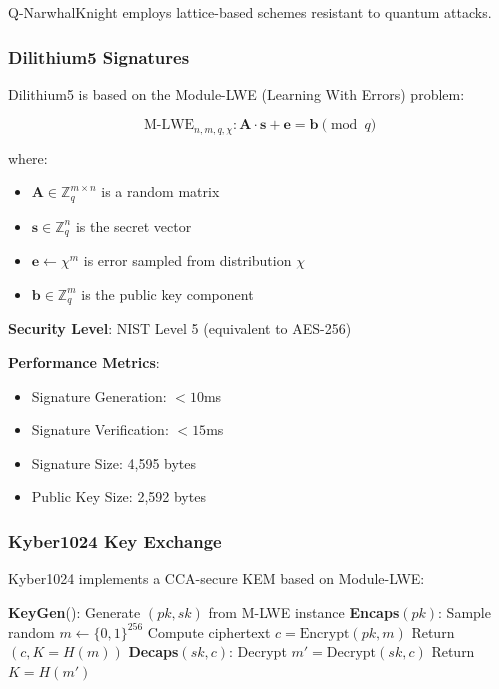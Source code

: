 \documentclass[11pt,a4paper]{article}
\begin{document}
Q-NarwhalKnight employs lattice-based schemes resistant to quantum attacks.

\subsubsection{Dilithium5 Signatures}

Dilithium5 is based on the Module-LWE (Learning With Errors) problem:

\begin{equation}
\text{M-LWE}_{n,m,q,\chi}: \mathbf{A} \cdot \mathbf{s} + \mathbf{e} = \mathbf{b} \pmod{q}
\end{equation}

where:
\begin{itemize}
    \item $\mathbf{A} \in \mathbb{Z}_q^{m \times n}$ is a random matrix
    \item $\mathbf{s} \in \mathbb{Z}_q^n$ is the secret vector
    \item $\mathbf{e} \leftarrow \chi^m$ is error sampled from distribution $\chi$
    \item $\mathbf{b} \in \mathbb{Z}_q^m$ is the public key component
\end{itemize}

\textbf{Security Level}: NIST Level 5 (equivalent to AES-256)

\textbf{Performance Metrics}:
\begin{itemize}
    \item Signature Generation: $<10$ms
    \item Signature Verification: $<15$ms
    \item Signature Size: 4,595 bytes
    \item Public Key Size: 2,592 bytes
\end{itemize}

\subsubsection{Kyber1024 Key Exchange}

Kyber1024 implements a CCA-secure KEM based on Module-LWE:

\begin{algorithm}
\caption{Kyber1024 Key Encapsulation}
\begin{algorithmic}
\STATE \textbf{KeyGen}(): Generate $(pk, sk)$ from M-LWE instance
\STATE \textbf{Encaps}$(pk)$: 
    \STATE \quad Sample random $m \leftarrow \{0,1\}^{256}$
    \STATE \quad Compute ciphertext $c = \text{Encrypt}(pk, m)$
    \STATE \quad Return $(c, K = H(m))$
\STATE \textbf{Decaps}$(sk, c)$:
    \STATE \quad Decrypt $m' = \text{Decrypt}(sk, c)$
    \STATE \quad Return $K = H(m')$
\end{algorithmic}
\end{algorithm}
\end{document}
